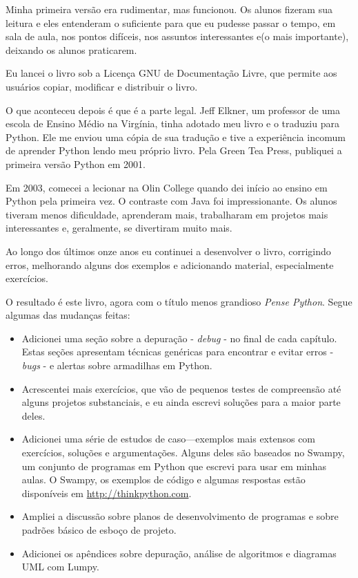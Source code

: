 \documentclass[10pt]{book}
\begin{document}
Minha primeira versão era rudimentar, mas funcionou. Os alunos fizeram sua leitura
e eles entenderam o suficiente para que eu pudesse passar o tempo, em sala de aula, nos
pontos difíceis, nos assuntos interessantes e(o mais importante), deixando
os alunos praticarem.

Eu lancei o livro sob a Licença GNU de Documentação Livre,
que permite aos usuários copiar, modificar e distribuir o livro.

O que aconteceu depois é que é a parte legal. Jeff Elkner, um professor de uma escola
de Ensino Médio na Virgínia, tinha adotado meu livro e o traduziu para
Python. Ele me enviou uma cópia de sua tradução e tive a
experiência incomum de aprender Python lendo meu próprio livro.
Pela Green Tea Press, publiquei a primeira versão Python em 2001.

Em 2003, comecei a lecionar na Olin College quando dei início ao ensino em
Python pela primeira vez. O contraste com Java foi impressionante.
Os alunos tiveram menos dificuldade, aprenderam mais, trabalharam em projetos
mais interessantes e, geralmente, se divertiram muito mais.

Ao longo dos últimos onze anos eu continuei a desenvolver o livro,
corrigindo erros, melhorando alguns dos exemplos e
adicionando material, especialmente exercícios.

O resultado é este livro, agora com o título menos grandioso
{\em Pense Python}. Segue algumas das mudanças feitas:

\begin{itemize}

\item Adicionei uma seção sobre a depuração - {\em debug} - no final de cada capítulo.
  Estas seções apresentam técnicas genéricas para encontrar e evitar
  erros - {\em bugs} -  e alertas sobre armadilhas em Python.

\item Acrescentei mais exercícios, que vão de pequenos testes de
  compreensão até alguns projetos substanciais, e eu ainda escrevi
  soluções para a maior parte deles.

\item Adicionei uma série de estudos de caso---exemplos mais extensos com
  exercícios, soluções e argumentações. Alguns deles são baseados no
  Swampy, um conjunto de programas em Python que escrevi para usar em minhas aulas.
  O Swampy, os exemplos de código e algumas respostas estão disponíveis em
  \url{http://thinkpython.com}.
  
\item Ampliei a discussão sobre planos de desenvolvimento de programas
  e sobre padrões básico de esboço de projeto.

\item Adicionei os apêndices sobre depuração, análise de algoritmos e
  diagramas UML com Lumpy.

\end{itemize}
\end{document}
